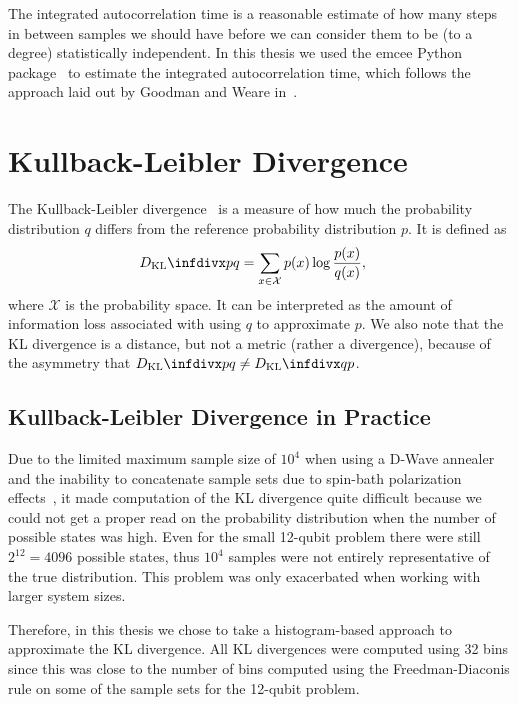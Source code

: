 The integrated autocorrelation time is a reasonable estimate of how many steps in between samples we should have before we can consider them to be (to a degree) statistically independent.
In this thesis we used the emcee Python package~\cite{python_emcee} to estimate the integrated autocorrelation time, which follows the approach laid out by Goodman and Weare in~\cite{goodman_weare_2010}.

\section{Kullback-Leibler Divergence}\label{app:kl_divergence}
The Kullback-Leibler divergence~\cite{kullback_1951} is a measure of how much the probability distribution \( q \) differs from the reference probability distribution \( p \).
It is defined as
\begin{align}
    \DKL{p}{q}
        &= \sum_{x\in\mathcal{X}} p(x) \log\frac{p(x)}{q(x)},
\end{align}
where \( \mathcal{X} \) is the probability space.
It can be interpreted as the amount of information loss associated with using \( q \) to approximate \( p \).
We also note that the KL divergence is a distance, but not a metric (rather a divergence), because of the asymmetry that \( \DKL{p}{q} \ne \DKL{q}{p} \).

\subsection{Kullback-Leibler Divergence in Practice}\label{app:kl_divergence_in_practice}
Due to the limited maximum sample size of \( 10^4 \) when using a D-Wave annealer and the inability to concatenate sample sets due to spin-bath polarization effects~\cite{pochart_2021}, it made computation of the KL divergence quite difficult because we could not get a proper read on the probability distribution when the number of possible states was high.
Even for the small 12-qubit problem there were still \( 2^{12} = 4096 \) possible states, thus \( 10^4 \) samples were not entirely representative of the true distribution.
This problem was only exacerbated when working with larger system sizes.

Therefore, in this thesis we chose to take a histogram-based approach to approximate the KL divergence.
All KL divergences were computed using 32 bins since this was close to the number of bins computed using the Freedman-Diaconis rule on some of the sample sets for the 12-qubit problem.

